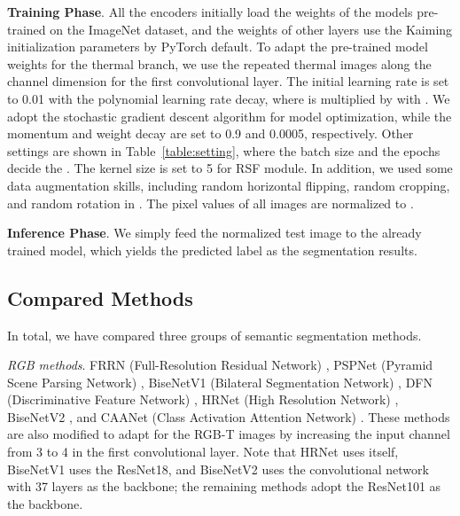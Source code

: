 \documentclass[10.5pt,twocolumn,journal,letterpaper]{IEEEtran}
\begin{document}
\textbf{Training Phase}. All the encoders initially load the weights of the models pre-trained on the ImageNet \cite{deng-cvpr2009-imagenet} dataset, and the weights of other layers use the Kaiming initialization \cite{he-iccv2015-delving} parameters by PyTorch default. To adapt the pre-trained model weights for the thermal branch, we use the repeated thermal images along the channel dimension for the first convolutional layer. The initial learning rate  is set to 0.01 with the polynomial learning rate decay, where  is multiplied by  with . We adopt the stochastic gradient descent algorithm for model optimization, while the momentum and weight decay are set to 0.9 and 0.0005, respectively. Other settings are shown in Table~\ref{table:setting}, where the batch size and the epochs decide the . The kernel size  is set to 5 for RSF module. In addition, we used some data augmentation skills, including random horizontal flipping, random cropping, and random rotation in . The pixel values of all images are normalized to . 

\textbf{Inference Phase}. We simply feed the normalized test image to the already trained model, which yields the predicted label  as the segmentation results.


\begin{table}[!t]
	\centering
	\caption{Experimental settings.}
	\label{table:setting}
\end{table}
	
\subsection{Compared Methods}
In total, we have compared three groups of semantic segmentation methods. 

\textit{RGB methods}. FRRN (Full-Resolution Residual Network) \cite{pohlen-cvpr2017-frrn}, PSPNet (Pyramid Scene Parsing Network) \cite{zhao-cvpr2017-pspnet}, BiseNetV1 (Bilateral Segmentation Network) \cite{yu-eccv2018-bisenet}, DFN (Discriminative Feature Network) \cite{yu-cvpr2018-dfn}, HRNet (High Resolution Network) \cite{sun-cvpr2019-hrnet}, BiseNetV2 \cite{yu-ijcv2021-bisenetv2}, and CAANet (Class Activation Attention Network) \cite{liu-cvpr2022-caanet}. These methods are also modified to adapt for the RGB-T images by increasing the input channel from 3 to 4 in the first convolutional layer. Note that HRNet uses itself, BiseNetV1 uses the ResNet18, and BiseNetV2 uses the convolutional network with 37 layers as the backbone; the remaining methods adopt the ResNet101 as the backbone.
\end{document}
